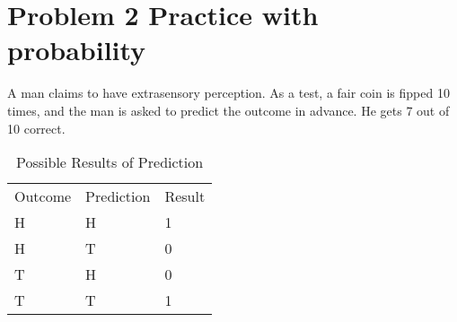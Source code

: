 \documentclass[preprint,12pt]{elsarticle}
\begin{document}
    \section{Problem 2 Practice with probability}
    A man claims to have extrasensory perception. As a test, a fair coin is fipped 10 times, and the man is
    asked to predict the outcome in advance. He gets 7 out of 10 correct.
    \begin{table}[]
        \centering
        \caption{Possible Results of Prediction}
        \label{my-label}
        \begin{tabular}{lll}
        Outcome & Prediction & Result \\
        H       & H          & 1  \\
        H       & T          & 0   \\
        T       & H          & 0   \\
        T       & T          & 1    \\
        \end{tabular}
    \end{table}
\end{document}
